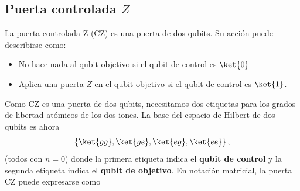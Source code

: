 \subsection{Puerta controlada $Z$}

La puerta controlada-Z (CZ) es una puerta de dos qubits. Su acción puede describirse como:
\begin{itemize}
\item No hace nada al qubit objetivo si el qubit de control es $\ket{0}$
\item Aplica una puerta $Z$ en el qubit objetivo si el qubit de control es $\ket{1}$.
\end{itemize}
 
Como CZ es una puerta de dos qubits, necesitamos dos etiquetas para los grados de libertad atómicos de los dos iones. La base del espacio de Hilbert de dos qubits es ahora 
	\begin{equation*}
	\{\ket{gg}, \ket{ge}, \ket{eg}, \ket{ee} \}\, , 
	\end{equation*}
(todos con $n=0$) donde la primera etiqueta indica el \textbf{qubit de control} y la segunda etiqueta indica el \textbf{qubit de objetivo}. En notación matricial, la puerta CZ puede expresarse como

